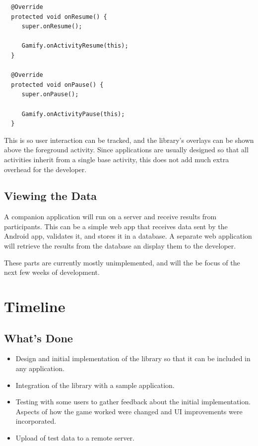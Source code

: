 \begin{verbatim}
  @Override
  protected void onResume() {
     super.onResume();

     Gamify.onActivityResume(this);
  }
  
  @Override
  protected void onPause() {
     super.onPause();

     Gamify.onActivityPause(this);
  }
\end{verbatim}

This is so user interaction can be tracked, and the library's overlays can be shown above the foreground activity. Since applications are usually designed so that all activities inherit from a single base activity, this does not add much extra overhead for the developer.

\section{Viewing the Data}

A companion application will run on a server and receive results from participants. This can be a simple web app that receives data sent by the Android app, validates it, and stores it in a database. A separate web application will retrieve the results from the database an display them to the developer.

These parts are currently mostly unimplemented, and will the be focus of the next few weeks of development.

\chapter{Timeline}

\section{What's Done}

\begin{itemize}
\item
Design and initial implementation of the library so that it can be included in any application.
\item
Integration of the library with a sample application.
\item
Testing with some users to gather feedback about the initial implementation. Aspects of how the game worked were changed and UI improvements were incorporated.
\item
Upload of test data to a remote server.
\end{itemize}

